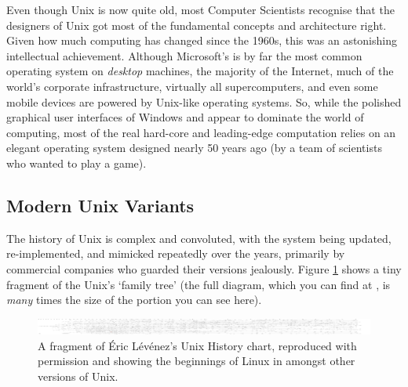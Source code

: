 
Even though Unix is now quite old, most Computer Scientists recognise that the designers of Unix got most of the fundamental concepts and
architecture right. Given how much computing has changed since the 1960s, this was an astonishing intellectual achievement. Although Microsoft's  is by far the most common operating system on \emph{desktop} machines, the majority of the Internet, much of the world's corporate infrastructure, virtually all supercomputers, and even some mobile devices are powered by Unix-like operating systems. So, while the polished graphical user interfaces of Windows and  appear to dominate the world of computing, most of the real hard-core and leading-edge computation relies on an elegant operating system designed nearly 50 years ago (by a team of scientists who wanted to play a game).  

\subsection{Modern Unix Variants}
\label{sec:modern-unix-variants}


The history of Unix is complex and convoluted, with the system being updated, re-implemented, and mimicked repeatedly over the years, primarily by commercial companies who guarded their versions jealously. Figure \ref{fig:unix-history} shows a tiny fragment of the Unix's `family tree' (the full diagram, which you can find at , is \emph{many} times the size of the portion you can see here).

\begin{figure}[h!tb]
  \begin{center}
    \includegraphics[width=13cm]{images/unix}
  \end{center}
\caption{A fragment of \'{E}ric L\'{e}v\'{e}nez's Unix History chart, reproduced with permission and showing the beginnings of Linux in amongst other versions of Unix.}
\label{fig:unix-history}
\end{figure}
 
